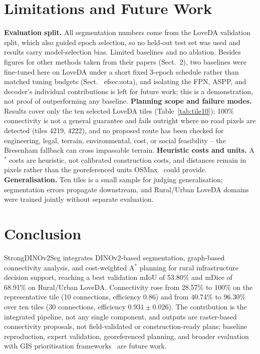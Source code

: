 \documentclass[runningheads]{llncs}
\begin{document}
\section{Limitations and Future Work}
\textbf{Evaluation split.} All segmentation numbers come from the LoveDA validation split, which also guided epoch selection, so no held-out test set was used and results carry model-selection bias. Limited baselines and no ablation. Besides figures for other methods taken from their papers (Sect.~2), two baselines were fine-tuned here on LoveDA under a short fixed 3-epoch schedule rather than matched tuning budgets (Sect.~
ef{sec:sota}), and isolating the FPN, ASPP, and decoder's individual contributions is left for future work; this is a demonstration, not proof of outperforming any baseline. \textbf{Planning scope and failure modes.} Results cover only the ten selected LoveDA tiles (Table~\ref{tab:tile10}); 100\% connectivity is not a general guarantee and fails outright where no road pixels are detected (tiles 4219, 4222), and no proposed route has been checked for engineering, legal, terrain, environmental, cost, or social feasibility -- the Bresenham fallback can cross impassable terrain. \textbf{Heuristic costs and units.} A$^{*}$ costs are heuristic, not calibrated construction costs, and distances remain in pixels rather than the georeferenced units OSMnx~\cite{boeing2017} could provide. \textbf{Generalisation.} Ten tiles is a small sample for judging generalisation; segmentation errors propagate downstream, and Rural/Urban LoveDA domains were trained jointly without separate evaluation.

\section{Conclusion}
StrongDINOv2Seg integrates DINOv2-based segmentation, graph-based connectivity analysis, and cost-weighted A$^{*}$ planning for rural infrastructure decision support, reaching a best validation mIoU of 53.80\% and mDice of 68.91\% on Rural/Urban LoveDA. Connectivity rose from 28.57\% to 100\% on the representative tile (10 connections, efficiency 0.86) and from 40.74\% to 96.30\% over ten tiles (30 connections, efficiency $0.931\pm0.026$). The contribution is the integrated pipeline, not any single component, and outputs are raster-based connectivity proposals, not field-validated or construction-ready plans; baseline reproduction, expert validation, georeferenced planning, and broader evaluation with GIS prioritisation frameworks~\cite{verma2020,kapoor2021} are future work.
\end{document}
